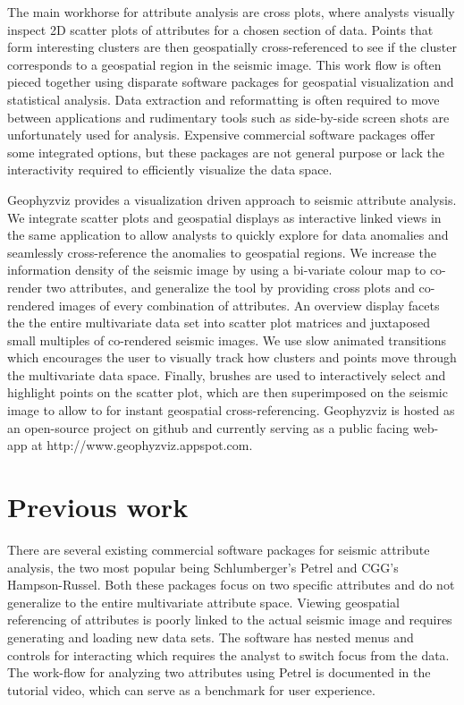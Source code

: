 \documentclass[journal]{vgtc}                %
\begin{document}
The main workhorse for attribute analysis are cross plots, where analysts visually inspect
2D scatter plots of attributes for a chosen section of data. Points that form interesting clusters
are then geospatially cross-referenced to see if the cluster corresponds to a geospatial region in the seismic image.
This work flow is often pieced together using disparate software packages for geospatial visualization
and statistical analysis. Data extraction and reformatting is often required to move between applications
and rudimentary tools such as side-by-side screen shots are unfortunately used for analysis.
Expensive commercial software packages offer some integrated options, but these packages are not general
purpose or lack the interactivity required to efficiently visualize the data space.

Geophyzviz provides a visualization driven approach to seismic attribute analysis. We integrate
scatter plots and geospatial displays as interactive linked views in the same application to allow
analysts to quickly explore for data anomalies and seamlessly cross-reference the anomalies to geospatial
regions. We increase the information density of the seismic image by using a bi-variate colour map to
co-render two attributes, and generalize the tool by providing cross plots and co-rendered images of
every combination of attributes. An overview display facets the the entire multivariate data set into
scatter plot matrices and juxtaposed small multiples of co-rendered seismic images. We use slow animated
transitions which encourages the user to visually track how clusters and points move through
the multivariate data space. Finally, brushes are used to interactively select and highlight
points on the scatter plot, which are then superimposed on the seismic image to allow to for
instant geospatial cross-referencing. Geophyzviz is hosted as an open-source project on github
and currently serving as a public facing web-app at http://www.geophyzviz.appspot.com.

\section{Previous work}

There are several existing commercial software packages for seismic attribute analysis, the
two most popular being Schlumberger's Petrel and CGG's Hampson-Russel. Both these packages
focus on two specific attributes and do not generalize to the entire multivariate attribute space.
Viewing geospatial referencing of attributes is poorly linked to the actual seismic image and requires
generating and loading new data sets. The software has nested menus and controls for interacting
which requires the analyst to switch focus from the data. The work-flow for analyzing two attributes
using Petrel is documented in the tutorial video, which can serve as a benchmark for user experience.
\end{document}
